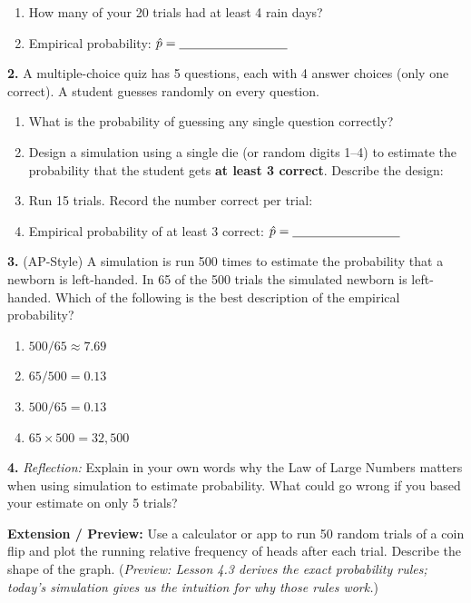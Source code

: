 \documentclass[10pt]{article}
\begin{document}
\begin{practicebox}
\begin{enumerate}[label=(\alph*), leftmargin=2em, itemsep=8pt]
  \item How many of your 20 trials had at least 4 rain days? \blank{2cm}
  \item Empirical probability: $\hat{p} = \blank{3cm}$
\end{enumerate}

\vspace{8pt}
\textbf{2.} A multiple-choice quiz has 5 questions, each with 4 answer choices (only one correct).
A student guesses randomly on every question.

\begin{enumerate}[label=(\alph*), leftmargin=2em, itemsep=8pt]
  \item What is the probability of guessing any single question correctly? \blank{2cm}
  \item Design a simulation using a single die (or random digits 1--4) to estimate the
        probability that the student gets \textbf{at least 3 correct}.
        Describe the design: \writeline\writeline
  \item Run 15 trials. Record the number correct per trial:
        \vspace{20pt}
  \item Empirical probability of at least 3 correct: $\hat{p} = \blank{3cm}$
\end{enumerate}

\vspace{8pt}
\textbf{3.} (AP-Style) A simulation is run 500 times to estimate the probability
that a newborn is left-handed. In 65 of the 500 trials the simulated newborn is
left-handed. Which of the following is the best description of the empirical
probability?

\begin{enumerate}[label=(\Alph*), leftmargin=2em, itemsep=4pt]
  \item $500/65 \approx 7.69$
  \item $65/500 = 0.13$
  \item $500/65 = 0.13$
  \item $65 \times 500 = 32{,}500$
\end{enumerate}

\vspace{8pt}
\textbf{4.} \textit{Reflection:} Explain in your own words why the Law of Large Numbers
matters when using simulation to estimate probability. What could go wrong if you based
your estimate on only 5 trials?\\[6pt]
\writeline\writeline\writeline

\vspace{8pt}
\textbf{Extension / Preview:} Use a calculator or app to run 50 random trials of a
coin flip and plot the running relative frequency of heads after each trial. Describe
the shape of the graph. (\textit{Preview: Lesson 4.3 derives the exact probability
rules; today's simulation gives us the intuition for why those rules work.})

\end{practicebox}
\end{document}
